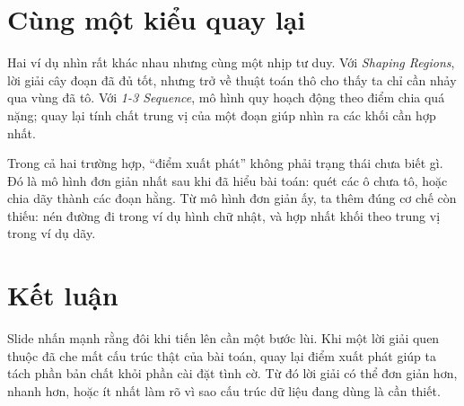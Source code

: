 \documentclass[11pt]{article}
\begin{document}
\section{Cùng một kiểu quay lại}

Hai ví dụ nhìn rất khác nhau nhưng cùng một nhịp tư duy. Với \textit{Shaping
Regions}, lời giải cây đoạn đã đủ tốt, nhưng trở về thuật toán thô cho thấy
ta chỉ cần nhảy qua vùng đã tô. Với \textit{1-3 Sequence}, mô hình quy hoạch
động theo điểm chia quá nặng; quay lại tính chất trung vị của một đoạn giúp
nhìn ra các khối cần hợp nhất.

Trong cả hai trường hợp, ``điểm xuất phát'' không phải trạng thái chưa biết
gì. Đó là mô hình đơn giản nhất sau khi đã hiểu bài toán: quét các ô chưa tô,
hoặc chia dãy thành các đoạn hằng. Từ mô hình đơn giản ấy, ta thêm đúng cơ chế
còn thiếu: nén đường đi trong ví dụ hình chữ nhật, và hợp nhất khối theo trung
vị trong ví dụ dãy.

\section{Kết luận}

Slide nhấn mạnh rằng đôi khi tiến lên cần một bước lùi. Khi một lời giải quen
thuộc đã che mất cấu trúc thật của bài toán, quay lại điểm xuất phát giúp ta
tách phần bản chất khỏi phần cài đặt tình cờ. Từ đó lời giải có thể đơn giản
hơn, nhanh hơn, hoặc ít nhất làm rõ vì sao cấu trúc dữ liệu đang dùng là cần
thiết.
\end{document}
